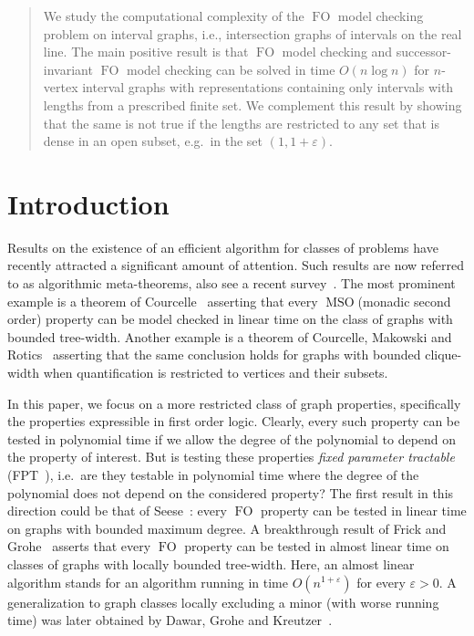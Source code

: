 \documentclass{CSML}
\newcommand{\FO}{\ensuremath{\operatorname{FO}}\xspace}
\newcommand{\MSO}{\ensuremath{\operatorname{MSO}}\xspace}
\theoremstyle{plain}\newtheorem{claim}[thm]{Claim}
\begin{document}
\begin{abstract}
We study the computational complexity of the \FO model checking problem on
interval graphs, i.e., intersection graphs of intervals on the real line.
The main positive result is that \FO model checking and
successor-invariant \FO model checking can be solved
in time $O(n\log n)$ for $n$-vertex interval graphs with representations
containing only intervals with lengths from a prescribed finite set.
We complement this result by showing that the same is not true
if the lengths are restricted to any set that is dense in an open subset,
e.g.~in the set $(1,1+\varepsilon)$.
\end{abstract}


\maketitle\hfill

\section{Introduction}


Results on the existence of an efficient algorithm for classes of
problems have recently attracted a significant amount of attention. Such results
are now referred to as algorithmic meta-theorems, also see a recent survey~\cite{kre09}.
The most prominent example is a theorem of Courcelle~\cite{cou90}
asserting that every \MSO (monadic second order) property can be model checked in linear time on the class of
graphs with bounded tree-width. Another example is a theorem of Courcelle, Makowski and
Rotics~\cite{cmr00} asserting that the same conclusion holds for graphs
with bounded clique-width when quantification is restricted to vertices and
their subsets.

In this paper, we focus on a more restricted class of graph properties,
specifically the properties expressible
in first order logic. Clearly, every such property can be tested in polynomial time
if we allow the degree of the polynomial to depend on the property of interest.
But is testing these properties {\em fixed parameter tractable}
(FPT~\cite{df13}), i.e.~are they testable in polynomial time where the degree of the polynomial does
not depend on the considered property?
The first result
in this direction could be that of Seese~\cite{see96}: every \FO property
can be tested in linear time on graphs with bounded maximum degree. A breakthrough
result of Frick and Grohe~\cite{fg01} asserts that every \FO property can be tested in almost
linear time on classes of graphs with locally bounded tree-width. Here, an almost
linear algorithm stands for an algorithm running in time $O(n^{1+\varepsilon})$
for every $\varepsilon>0$.
A generalization to graph classes locally excluding a minor (with worse running time)
was later obtained by Dawar, Grohe and Kreutzer~\cite{dgk07}. 
\end{document}
